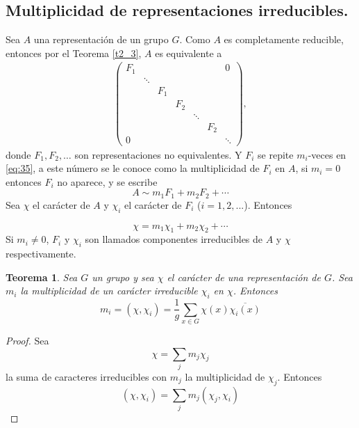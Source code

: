 \documentclass[12pt]{book}
\newtheorem{theorem}{Teorema}[section]
\theoremstyle{definition}
\newcounter{in}
\begin{document}
\subsection{Multiplicidad de representaciones irreducibles.}
\label{subsec:mri}
 Sea $A$ una representación de un grupo $G$. Como $A$ es completamente
reducible, entonces por el Teorema \ref{t2_3}, $A$ es equivalente a
\begin{equation}
  \label{eq:35}
  \begin{aligned}
    \begin{pmatrix}
      F_{1} & & & & & & 0\\ 
      & \ddots & & & & & \\
      & & F_{1} & & & & \\
      & & & F_{2} & & & \\
      & & & & \ddots & & \\
      & & & & & F_{2} & \\
      0 & & & & & & \ddots
    \end{pmatrix},
  \end{aligned}
\end{equation}
donde $F_{1}, F_{2}, \ldots$ son representaciones no equivalentes. Y
$F_{i}$ se repite $m_{i}$-veces en \ref{eq:35}, a este número se le
conoce como la multiplicidad de $F_{i}$ en $A$, si $m_{i}=0$ entonces
$F_{i}$ no aparece, y se escribe
\begin{equation}
  \label{eq:36}
  A \sim m_{1} F_{1}+ m_{2} F_{2}+ \cdots
\end{equation}
Sea $\chi$ el carácter de $A$ y $\chi_{i}$ el carácter de $F_{i}$
($i = 1, 2, ...$). Entonces

\begin{equation}
  \label{eq:37}
  \chi =m_{1} \chi_{1}+ m_{2} \chi_{2}+ \cdots
\end{equation}
Si $m_{i} \neq 0$, $F_{i}$ y $\chi_{i}$ son llamados componentes
irreducibles de $A$ y $\chi$ respectivamente.

\begin{theorem}
  \label{t4_5}
  Sea $G$ un grupo y sea $\chi$ el carácter de una
  representación de $G$. Sea $m_{i}$ la multiplicidad de un carácter
  irreducible $\chi_{i}$ en $\chi$. Entonces
  \begin{equation*}
    m_{i} = (\chi,\chi_{i}) = \frac{1}{g} \sum_{x \in G} \chi(x) \overline{\chi_{i}(x)}
  \end{equation*}

\end{theorem}
\begin{proof}
  Sea $$\chi=\sum_{j} m_{j} \chi_{j}$$ la suma de caracteres
  irreducibles con $m_{j}$ la multiplicidad de $\chi_{j}$. Entonces
  \begin{equation}
    \label{eq:38}
    (\chi,\chi_{i}) = \sum_{j} m_{j} (\chi_{j},\chi_{i})
  \end{equation}
\end{proof}
\end{document}
